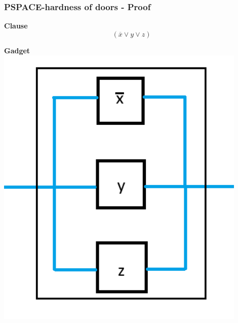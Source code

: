 \documentclass{beamer}
\begin{document}
\begin{frame}
  \frametitle{PSPACE-hardness of doors - Proof}
  \begin{minipage}[t]{0.45\textwidth}
    \textbf{Clause}
    \[ (\overline{x} \lor y \lor z) \]
  \end{minipage}
  \begin{minipage}[t]{0.45\textwidth}
    \textbf{Gadget}
    \includegraphics[width=0.9\textwidth]{res/prove/ClauseGadget.png}
  \end{minipage}
\end{frame}
\end{document}
